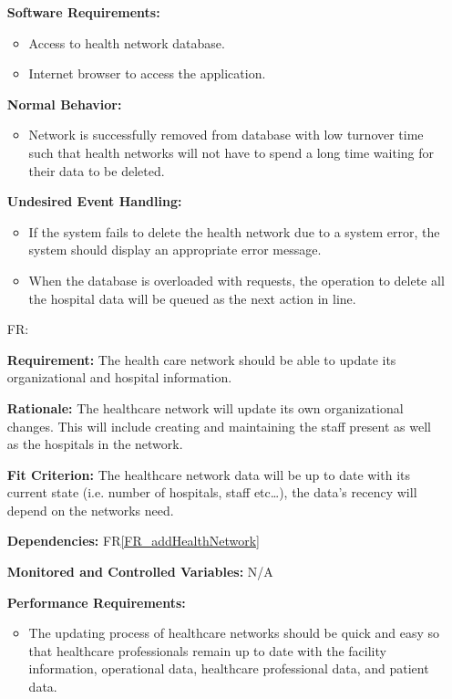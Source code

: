 \documentclass[12pt]{article}
\newcounter{reqnum} %
\begin{document}
\begin{itemize}
\textbf{Software Requirements:}
\begin{itemize}
  \item Access to health network database.
  \item Internet browser to access the application.
\end{itemize}

\textbf{Normal Behavior:}
\begin{itemize}
  \item Network is successfully removed from database with low turnover time such that health networks will not have to spend a long time waiting for their data to be deleted.
\end{itemize}

\textbf{Undesired Event Handling:}
\begin{itemize}
  \item If the system fails to delete the health network due to a system error, the system should display an appropriate error message. 
  \item When the database is overloaded with requests, the operation to delete all the hospital data will be queued as the next action in line.
\end{itemize}


\item[FR\refstepcounter{reqnum}\thereqnum \label{FR_UpdateHealthNetwork}:]

\textbf{Requirement:} The health care network should be able to update its organizational and hospital information.

\textbf{Rationale:} The healthcare network will update its own organizational changes. This will include creating and maintaining the staff present as well as the hospitals in the network.

\textbf{Fit Criterion:} The healthcare network data will be up to date with its current state (i.e. number of hospitals, staff etc…), the data’s recency will depend on the networks need. 

\textbf{Dependencies:} FR\ref{FR_addHealthNetwork}

\textbf{Monitored and Controlled Variables:} N/A

\textbf{Performance Requirements:} 
\begin{itemize}
  \item The updating process of healthcare networks should be quick and easy so that healthcare professionals remain up to date with the facility information, operational data, healthcare professional data, and patient data.
\end{itemize}


\end{itemize}
\end{document}

